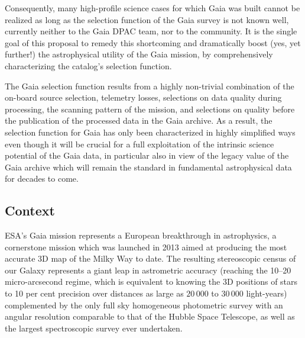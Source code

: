 Consequently, many high-profile science cases for which Gaia was built cannot be realized as long as the selection function of the Gaia survey is not known well, currently neither to the Gaia DPAC team, nor to the community. It is the single goal of this proposal to remedy this shortcoming and dramatically boost (yes, yet further!) the astrophysical utility of the Gaia mission, by comprehensively characterizing the catalog's selection function.

The Gaia selection function results from a highly non-trivial combination of the on-board source selection, telemetry losses, selections on data quality during processing, the scanning pattern of the mission, and selections on quality before the publication of the processed data in the Gaia archive. As a result, the selection function for Gaia has only been characterized in highly simplified ways  even though it will be crucial for a full exploitation of the intrinsic science potential of the Gaia data, in particular also in view of the legacy value of the Gaia archive which will remain the standard in fundamental astrophysical data for decades to come.

\subsection{Context}
\label{sec:context}

ESA's Gaia mission \cite{2016A&A...595A...1G} represents a European breakthrough in astrophysics, a cornerstone mission which was launched in 2013 aimed at producing the most accurate 3D map of the Milky Way to date. The resulting stereoscopic census of our Galaxy represents a giant leap in astrometric accuracy (reaching the 10--20 micro-arcsecond regime, which is equivalent to knowing the 3D positions of stars to 10 per cent precision over distances as large as $20\,000$ to $30\,000$ light-years) complemented by the only full sky homogeneous photometric survey with an angular resolution comparable to that of the Hubble Space Telescope, as well as the largest spectroscopic survey ever undertaken. 

